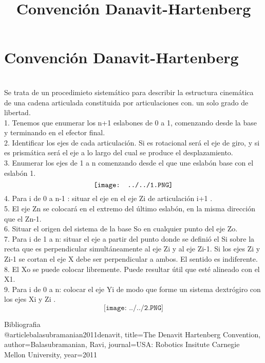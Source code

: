 \documentclass[12pt,a4paper]{article}
\title{Convención Danavit-Hartenberg}
\begin{document}
\section{\textbf{Convención Danavit-Hartenberg}}\\
Se trata de un procedimieto sistemático para describir la estructura cinemática de una cadena articulada constituida por articulaciones con. un solo grado de libertad.\\
1.	Tenemos que enumerar los n+1 eslabones de 0 a 1, comenzando desde la base y terminando en el efector final.\\
2.	Identificar los ejes de cada articulación. Si es rotacional será el eje de giro, y si es prismática será el eje a lo largo del cual se produce el desplazamiento.\\
3.	Enumerar los ejes de 1 a n comenzando desde el que une eslabón base con el eslabón 1.\\
$$\texttt{[image: ../../1.PNG]} \\$$
4.	 Para i de 0 a n-1 : situar el eje en el eje Zi de articulación i+1 .\\
5.	El eje Zn se colocará en el extremo del último eslabón, en la misma dirección que el Zn-1.\\
6.	Situar el origen del sistema de la base {So} en cualquier punto del eje Zo.\\
7.	Para  i de 1 a n: situar el eje a partir del punto donde se definió el {Si } sobre la recta que es perpendicular simultáneamente al eje Zi  y al eje Zi-1. Si los ejes Zi y Zi-1  se cortan el eje X debe ser perpendicular a ambos. El sentido es indiferente.\\
8.	El  Xo se puede colocar libremente. Puede resultar útil que esté alineado con el X1.\\
9.	Para  i de 0 a n: colocar el eje Yi de modo que forme un sistema dextrógiro con los ejes Xi y Zi .\\
$$\texttt{[image: ../../2.PNG]} $$

Bibliografia \\
@article{balasubramanian2011denavit,
  title={The Denavit Hartenberg Convention},
  author={Balasubramanian, Ravi},
  journal={USA: Robotics Insitute Carnegie Mellon University},
  year={2011}
}
\end{document}
